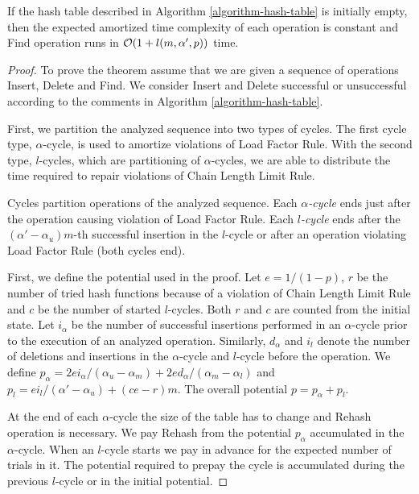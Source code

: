 \begin{theorem}
\label{theorem-amortised-expected-time}
If the hash table described in Algorithm \ref{algorithm-hash-table} is initially empty, then the expected amortized time complexity of each operation is constant and Find operation runs in $\mathcal{O}(1 + l(m, \alpha', p))$ time.
\end{theorem}
\begin{proof}
To prove the theorem assume that we are given a sequence of operations Insert, Delete and Find. 
We consider Insert and Delete successful or unsuccessful according to the comments in Algorithm \ref{algorithm-hash-table}.

First, we partition the analyzed sequence into two types of cycles. 
The first cycle type, $\alpha$-cycle, is used to amortize violations of Load Factor Rule. 
With the second type, $l$-cycles, which are partitioning of $\alpha$-cycles, we are able to distribute the time required to repair violations of Chain Length Limit Rule.

\begin{definition}
Cycles partition operations of the analyzed sequence.
Each \emph{$\alpha$-cycle} ends just after the operation causing violation of Load Factor Rule.
Each \emph{$l$-cycle} ends after the $(\alpha'-\alpha_u)m$-th successful insertion in the $l$-cycle or after an operation violating Load Factor Rule (both cycles end).
\end{definition}

First, we define the potential used in the proof.
Let $e = 1/(1 - p)$, $r$ be the number of tried hash functions because of a violation of Chain Length Limit Rule and $c$ be the number of started $l$-cycles.
Both $r$ and $c$ are counted from the initial state.
Let $i_\alpha$ be the number of successful insertions performed in an $\alpha$-cycle prior to the execution of an analyzed operation.
Similarly, $d_\alpha$ and $i_l$ denote the number of deletions and insertions in the $\alpha$-cycle and $l$-cycle before the operation.
We define $p_\alpha = {2ei_{\alpha}}/{(\alpha_u - \alpha_m)} + {2ed_{\alpha}}/{(\alpha_m - \alpha_l)}$ and $p_l = {ei_{l}}/{(\alpha' - \alpha_u)} + (ce - r) m$.
The overall potential $p = p_\alpha + p_l$.

At the end of each $\alpha$-cycle the size of the table has to change and Rehash operation is necessary.
We pay Rehash from the potential $p_\alpha$ accumulated in the $\alpha$-cycle.
When an $l$-cycle starts we pay in advance for the expected number of trials in it.
The potential required to prepay the cycle is accumulated during the previous $l$-cycle or in the initial potential.


\end{proof}
